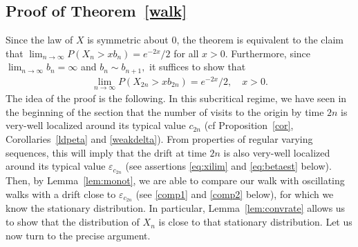 \documentclass[12pt]{amsart}
\begin{document}
\subsection{Proof of Theorem~\ref{walk}}
\label{subs:walk} Since the law of $X$ is symmetric about $0$, the
theorem is equivalent to the claim that $\lim_{n\to\infty} P(X_n
> xb_n )=e^{-2x}/2$ for all $x>0.$ Furthermore, since $\lim_{n\to\infty} b_n =\infty$
and $b_{n}\sim b_{n+1},$ it suffices to show that \begin{eqnarray*}
\lim_{n\to\infty} P(X_{2n} > xb_{2n} ) = e^{-2x}/2,\quad x>0. \end{eqnarray*}
The idea of the proof is the following. In this subcritical regime,
we have seen in the beginning of the section that the number of
visits to the origin by time $2n$ is very-well localized around its
typical value $c_{2n}$ (cf Proposition~\ref{cor},
Corollaries~\ref{ldpeta} and \ref{weakdelta}). From properties of
regular varying sequences, this will imply that the drift at time
$2n$ is also very-well localized around its typical value
${\varepsilon}_{c_{2n}}$ (see assertions \eqref{eq:xilim} and
\eqref{eq:betaest} below). Then, by Lemma~\ref{lem:monot}, we are
able to compare our walk with oscillating walks with a drift close
to ${\varepsilon}_{c_{2n}}$ (see \eqref{comp1} and \eqref{comp2} below), for
which we know the stationary distribution. In particular,
Lemma~\ref{lem:convrate} allows us to show that the distribution of
$X_n$ is close to that stationary distribution. Let us now turn to
the precise argument.
\par
\end{document}
